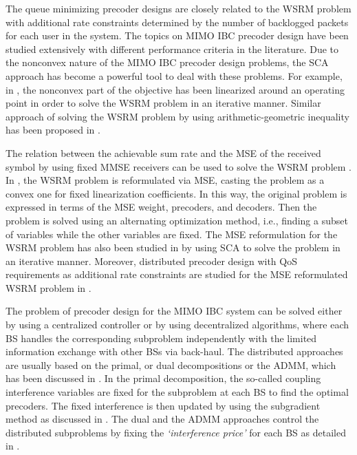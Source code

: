 The queue minimizing precoder designs are closely related to the \ac{WSRM} problem with additional rate constraints determined by the number of backlogged packets for each user in the system. The topics on \ac{MIMO} \ac{IBC} precoder design have been studied extensively with different performance criteria in the literature. Due to the nonconvex nature of the \ac{MIMO} \ac{IBC} precoder design problems, the \ac{SCA} approach has become a powerful tool to deal with these problems. For example, in \cite{sin_algorithm}, the nonconvex part of the objective has been linearized around an operating point in order to solve the \ac{WSRM} problem in an iterative manner. Similar approach of solving the \ac{WSRM} problem by using arithmetic-geometric inequality has been proposed in \cite{tran2012fast}.

The relation between the achievable sum rate and the \ac{MSE} of the received symbol by using fixed \ac{MMSE} receivers can be used to solve the \ac{WSRM} problem \cite{mse_duality}. In \cite{christensen2008weighted,wmmse_shi}, the \ac{WSRM} problem is reformulated via \ac{MSE}, casting the problem as a convex one for fixed linearization coefficients. In this way, the original problem is expressed in terms of the \ac{MSE} weight, precoders, and decoders. Then the problem is solved using an alternating optimization method, i.e., finding a subset of variables while the other variables are fixed. The \ac{MSE} reformulation for the \ac{WSRM} problem has also been studied in \cite{hong2012decomposition} by using \ac{SCA} to solve the problem in an iterative manner. Moreover, distributed precoder design with \ac{QoS} requirements as additional rate constraints are studied for the \ac{MSE} reformulated \ac{WSRM} problem in \cite{kaleva2013primal,kaleva2013decentralized}.

The problem of precoder design for the \ac{MIMO} \ac{IBC} system can be solved either by using a centralized controller or by using decentralized algorithms, where each \ac{BS} handles the corresponding subproblem independently with the limited information exchange with other \acp{BS} via back-haul. The distributed approaches are usually based on the primal, or dual decompositions or the \ac{ADMM}, which has been discussed in \cite{palomar2006tutorial,boyd2011distributed}. In the  primal decomposition, the so-called coupling interference variables are fixed for the subproblem at each \ac{BS} to find the optimal precoders. The fixed interference is then updated by using the subgradient method as discussed in \cite{pennanen2011decentralized}. The dual and the \ac{ADMM} approaches control the distributed subproblems by fixing the \emph{`interference price'} for each \ac{BS} as detailed in \cite{tolli2011decentralized}.

